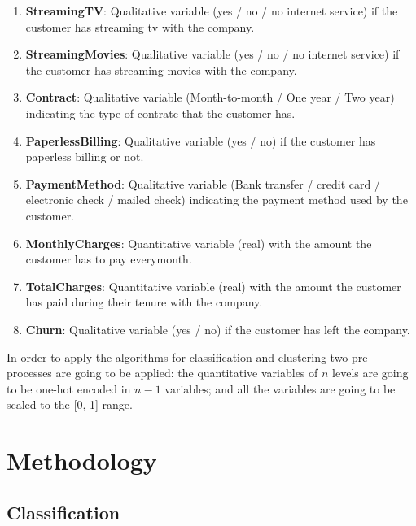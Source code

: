 \documentclass[a4paper,11pt]{article}
\begin{document}
\begin{enumerate}
	\item \textbf{StreamingTV}: Qualitative variable (yes / no / no internet service) if the customer has streaming tv with the company.
	\item \textbf{StreamingMovies}: Qualitative variable (yes / no / no internet service) if the customer has streaming movies with the company.
	\item \textbf{Contract}: Qualitative variable (Month-to-month / One year / Two year) indicating the type of contratc that the customer has.
	\item \textbf{PaperlessBilling}: Qualitative variable (yes / no) if the customer has paperless billing or not.
	\item \textbf{PaymentMethod}: Qualitative variable (Bank transfer / credit card / electronic check / mailed check) indicating the payment method used by the customer.
	\item \textbf{MonthlyCharges}: Quantitative variable (real) with the amount the customer has to pay everymonth.
	\item \textbf{TotalCharges}: Quantitative variable (real) with the amount the customer has paid during their tenure with the company.
	\item \textbf{Churn}: Qualitative variable (yes / no) if the customer has left the company.
\end{enumerate}

In order to apply the algorithms for classification and clustering two pre-processes are going to be applied: the quantitative variables of $n$ levels are going to be one-hot encoded in $n-1$ variables; and all the variables are going to be scaled to the [0, 1] range.

\section{Methodology}

\subsection{Classification}
\end{document}
